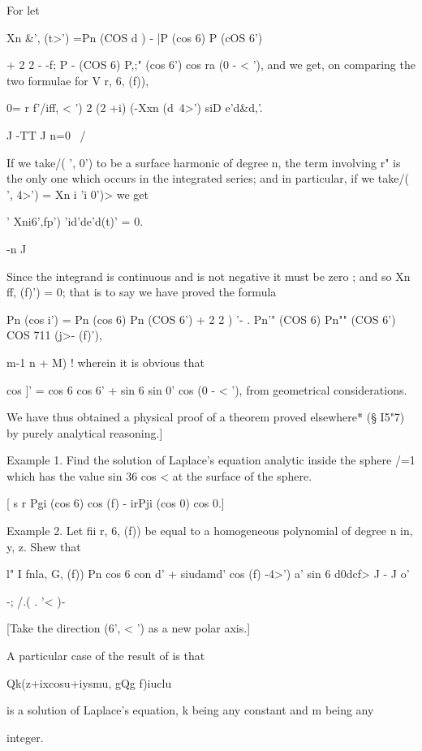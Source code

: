 For let

Xn \&', (t>') =Pn (COS d ) - |P (cos 6) P (cOS 6')

+ 2 2 - -f; P - (COS 6) P,;" (cos 6') cos ra (0 - < '), and we get,
on comparing the two formulae for V r, 6, (f)),

0= r f'/iff, < ') 2 (2 +i) (-Xxn (d\ 4>') siD e'd\&d,'.

J -TT J n=0 \ /

If we take/( ', 0') to be a surface harmonic of degree n, the term
involving r" is the only one which occurs in the integrated series;
and in particular, if we take/( ', 4>') = Xn i 'i 0')> we get

' Xni6',fp') 'id'de'd(t)' = 0.

-n J

Since the integrand is continuous and is not negative it must be zero
; and so Xn ff, (f)') = 0; that is to say we have proved the formula

Pn (cos i') = Pn (cos 6) Pn (COS 6') + 2 2 ) '- . Pn'" (COS 6) Pn""
(COS 6') COS 711 (j>- (f)'),

m-1 n + M) ! wherein it is obvious that

cos ]' = cos 6 cos 6' + sin 6 sin 0' cos (0 - < '), from geometrical
considerations.

We have thus obtained a physical proof of a theorem proved elsewhere*
(§ I5"7) by purely analytical reasoning.]

Example 1. Find the solution of Laplace's equation analytic inside the
sphere /=1 which has the value sin 36 cos < at the surface of the
sphere.

[ s r Pgi (cos 6) cos (f) - irPji (cos 0) cos 0.]

Example 2. Let fii r, 6, (f)) be equal to a homogeneous polynomial of
degree n in, y, z. Shew that

l" I fnla, G, (f)) Pn cos 6 con d' + siudamd' cos (f) -4>') a' sin 6
d0dcf> J - J o'

-; /.( . '< )-

[Take the direction (6', < ') as a new polar axis.]

A particular case of the result of is that

Qk(z+ixcosu+iysmu, gQg f)iuclu

is a solution of Laplace's equation, k being any constant and m being
any

integer.

